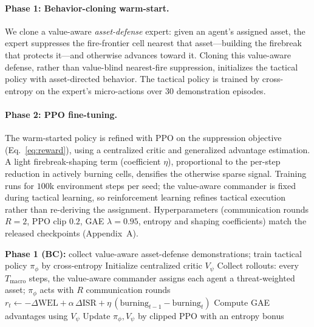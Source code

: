 \documentclass[letterpaper]{article}
\begin{document}
\paragraph{Phase 1: Behavior-cloning warm-start.}
We clone a value-aware \emph{asset-defense} expert: given an agent's assigned asset, the expert suppresses the fire-frontier cell nearest that asset---building the firebreak that protects it---and otherwise advances toward it. Cloning this value-aware defense, rather than value-blind nearest-fire suppression, initializes the tactical policy with asset-directed behavior. The tactical policy is trained by cross-entropy on the expert's micro-actions over $30$ demonstration episodes.

\paragraph{Phase 2: PPO fine-tuning.}
The warm-started policy is refined with PPO \citep{schulman2017} on the suppression objective (Eq.~\ref{eq:reward}), using a centralized critic and generalized advantage estimation. A light firebreak-shaping term (coefficient $\eta$), proportional to the per-step reduction in actively burning cells, densifies the otherwise sparse signal. Training runs for $100$k environment steps per seed; the value-aware commander is fixed during tactical learning, so reinforcement learning refines tactical execution rather than re-deriving the assignment. Hyperparameters (communication rounds $R{=}2$, PPO clip $0.2$, GAE $\lambda{=}0.95$, entropy and shaping coefficients) match the released checkpoints (Appendix~A).

\begin{algorithm}[t]
\caption{HierComm Training}
\label{alg:training}
\begin{algorithmic}[1]
\STATE \textbf{Phase 1 (BC):} collect value-aware asset-defense demonstrations; train tactical policy $\pi_\phi$ by cross-entropy
\STATE Initialize centralized critic $V_\psi$
    \STATE Collect rollouts: every $T_{\text{macro}}$ steps, the value-aware commander assigns each agent a threat-weighted asset; $\pi_\phi$ acts with $R$ communication rounds
    \STATE $r_t \leftarrow -\Delta\text{WEL} + \alpha\,\Delta\text{ISR} + \eta\,(\text{burning}_{t-1} - \text{burning}_t)$
    \STATE Compute GAE advantages using $V_\psi$
    \STATE Update $\pi_\phi, V_\psi$ by clipped PPO with an entropy bonus
\ENDFOR
\end{algorithmic}
\end{algorithm}
\end{document}

